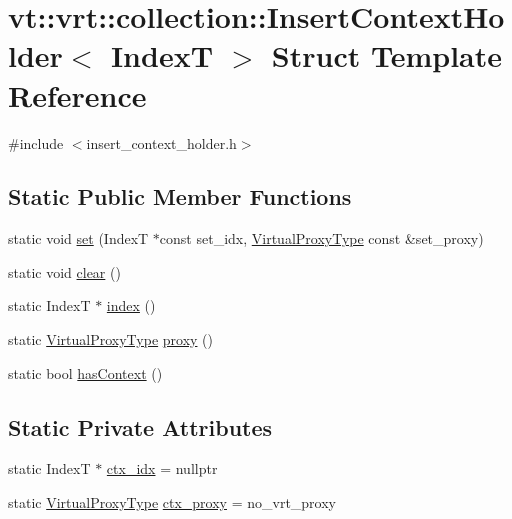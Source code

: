 \hypertarget{structvt_1_1vrt_1_1collection_1_1_insert_context_holder}{}\section{vt\+:\+:vrt\+:\+:collection\+:\+:Insert\+Context\+Holder$<$ IndexT $>$ Struct Template Reference}
\label{structvt_1_1vrt_1_1collection_1_1_insert_context_holder}


{\ttfamily \#include $<$insert\+\_\+context\+\_\+holder.\+h$>$}

\subsection*{Static Public Member Functions}
\begin{DoxyCompactItemize}
\item 
static void \hyperlink{structvt_1_1vrt_1_1collection_1_1_insert_context_holder_a6a045a1b570fcbabd30db317386a3a39}{set} (IndexT $\ast$const set\+\_\+idx, \hyperlink{namespacevt_a1b417dd5d684f045bb58a0ede70045ac}{Virtual\+Proxy\+Type} const \&set\+\_\+proxy)
\item 
static void \hyperlink{structvt_1_1vrt_1_1collection_1_1_insert_context_holder_a6223a4bd0422fa22d81972bedb246bdb}{clear} ()
\item 
static IndexT $\ast$ \hyperlink{structvt_1_1vrt_1_1collection_1_1_insert_context_holder_aba5840488b51c1274ca0f6fb4b6bc0f7}{index} ()
\item 
static \hyperlink{namespacevt_a1b417dd5d684f045bb58a0ede70045ac}{Virtual\+Proxy\+Type} \hyperlink{structvt_1_1vrt_1_1collection_1_1_insert_context_holder_a29cfb4e5c041062dff15b25e198db1a3}{proxy} ()
\item 
static bool \hyperlink{structvt_1_1vrt_1_1collection_1_1_insert_context_holder_a5b08452039d70ebb5cef640bfeb5c2ee}{has\+Context} ()
\end{DoxyCompactItemize}
\subsection*{Static Private Attributes}
\begin{DoxyCompactItemize}
\item 
static IndexT $\ast$ \hyperlink{structvt_1_1vrt_1_1collection_1_1_insert_context_holder_a6dfbc13e45aaf81b8fccdaa392353c69}{ctx\+\_\+idx} = nullptr
\item 
static \hyperlink{namespacevt_a1b417dd5d684f045bb58a0ede70045ac}{Virtual\+Proxy\+Type} \hyperlink{structvt_1_1vrt_1_1collection_1_1_insert_context_holder_a3376b0a19943233e7eb1fa2d18b4af6d}{ctx\+\_\+proxy} = no\+\_\+vrt\+\_\+proxy
\end{DoxyCompactItemize}


